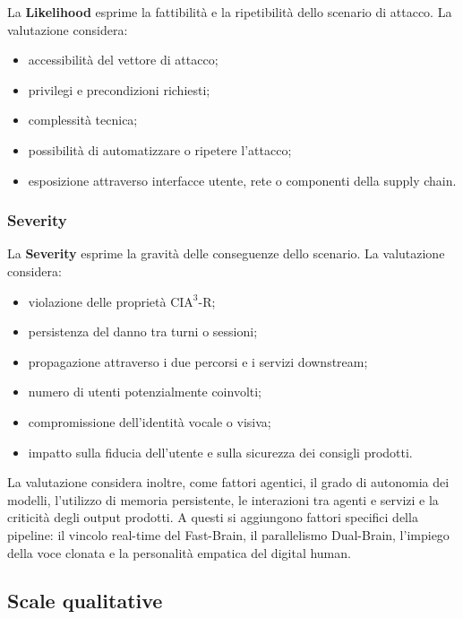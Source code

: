 \documentclass[11pt,a4paper]{article}
\begin{document}
La \textbf{Likelihood} esprime la fattibilità e la ripetibilità dello
scenario di attacco. La valutazione considera:

\begin{itemize}
    \item accessibilità del vettore di attacco;
    \item privilegi e precondizioni richiesti;
    \item complessità tecnica;
    \item possibilità di automatizzare o ripetere l'attacco;
    \item esposizione attraverso interfacce utente, rete o componenti
    della supply chain.
\end{itemize}

\subsubsection*{Severity}

La \textbf{Severity} esprime la gravità delle conseguenze dello
scenario. La valutazione considera:

\begin{itemize}
    \item violazione delle proprietà $\text{CIA}^3\text{-R}$;
    \item persistenza del danno tra turni o sessioni;
    \item propagazione attraverso i due percorsi e i servizi downstream;
    \item numero di utenti potenzialmente coinvolti;
    \item compromissione dell'identità vocale o visiva;
    \item impatto sulla fiducia dell'utente e sulla sicurezza dei
    consigli prodotti.
\end{itemize}

La valutazione considera inoltre, come fattori agentici, il grado di
autonomia dei modelli, l'utilizzo di memoria persistente, le
interazioni tra agenti e servizi e la criticità degli output prodotti.
A questi si aggiungono fattori specifici della pipeline: il vincolo
real-time del Fast-Brain, il parallelismo Dual-Brain, l'impiego della
voce clonata e la personalità empatica del digital human.


\subsection{Scale qualitative}
\end{document}
